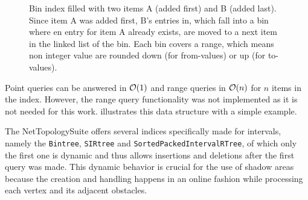 \begin{figure}[h]
\begin{figcenter}
			\end{figcenter}
			\caption{Bin index filled with two items A (added first) and B (added last). Since item A was added first, B's entries in, which fall into a bin where en entry for item A already exists, are moved to a next item in the linked list of the bin. Each bin covers a range, which means non integer value are rounded down (for from-values) or up (for to-values).}
			\label{fig:bin-index}
		\end{figure}
		
		Point queries can be answered in $\mathcal{O}(1)$ and range queries in $\mathcal{O}(n)$ for $n$ items in the index.
		However, the range query functionality was not implemented as it is not needed for this work.
		 illustrates this data structure with a simple example.
		
		The NetTopologySuite offers several indices specifically made for intervals, namely the \texttt{Bintree}, \texttt{SIRtree} and \texttt{SortedPackedIntervalRTree}, of which only the first one is dynamic and thus allows insertions and deletions after the first query was made.
		This dynamic behavior is crucial for the use of shadow areas because the creation and handling happens in an online fashion while processing each vertex and its adjacent obstacles.
		

